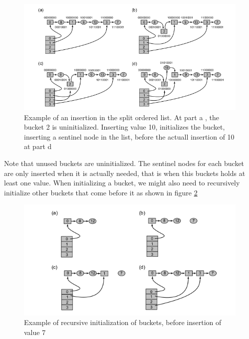 \begin{figure}
 \centering
  \includegraphics[scale=0.5]{split_ordered_2.png}
\caption[Example of an insertion in the split ordered list]{Example of an insertion in the split ordered list. At part a , the bucket 2 is uninitialized. Inserting value 10, initializes the bucket, inserting a sentinel node in the list, before the actuall insertion of 10 at part d}
\label{split_ordered_2}
\end{figure}

Note that unused buckets are uninitialized. The sentinel nodes for each bucket are only inserted when it is actually needed, that is when this buckets holds at least one value. When initializing a bucket, we might also need to recursively initialize other buckets that come before it as shown in figure \ref{split_ordered_3}

\begin{figure}
 \centering
  \includegraphics[scale=0.5]{split_ordered_3.png}
\caption{Example of recursive initialization of buckets, before insertion of value 7}
\label{split_ordered_3}
\end{figure}

